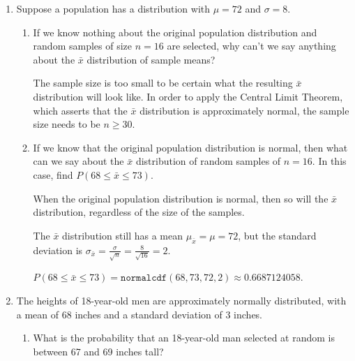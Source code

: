 \documentclass{article}
\newcommand{\answer}[1]{\color{red}#1}
\begin{document}
\pagestyle{myheadings}

\begin{center}
\textbf{}
\end{center}

\begin{enumerate}

\item Suppose a population has a distribution with $\mu = 72$ and $\sigma= 8$.
	\begin{enumerate}
	
	\item If we know nothing about the original population distribution and random samples of size $n=16$ are selected, why can't we say anything about the $\bar x$ distribution of sample means? 
	
	{\answer The sample size is too small to be certain what the resulting $\bar{x}$ distribution will look like.  In order to apply the Central Limit Theorem, which asserts that the $\bar{x}$ distribution is approximately normal, the sample size needs to be $n \geq 30$.
	} 

	\item If we know that the original population distribution is normal, then what can we say about the $\bar x$ distribution of random samples of $n=16$.  In this case, find $P(68 \leq \bar x \leq 73)$. 
	
	{\answer When the original population distribution is normal, then so will the $\bar{x}$ distribution, regardless of the size of the samples. 
	
	The $\bar{x}$ distribution still has a mean $\mu_{\bar{x}} = \mu = 72$, but the standard deviation is $\sigma_{\bar{x}} = \frac{\sigma}{\sqrt{n}} =\frac{8}{\sqrt{16}} = 2$. 
	
	$P(68 \leq \bar{x} \leq 73) = \texttt{normalcdf}(68, 73, 72, 2) \approx 0.6687124058$.
	} 
	
	\end{enumerate}
	
\item The heights of 18-year-old men are approximately normally distributed, with a mean of 68 inches and a standard deviation of 3 inches.

	\begin{enumerate}
	
	\item What is the probability that an 18-year-old man selected at random is between 67 and 69 inches tall? 
	

\end{enumerate}
\end{enumerate}
\end{document}
